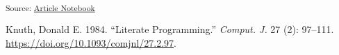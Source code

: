 \documentclass[
  a4paper,
  DIV=11,
  numbers=noendperiod]{scrreprt}
\newlength{\cslhangindent}
\newenvironment{CSLReferences}[2] %
 {\begin{list}{}{%
  \setlength{\itemindent}{0pt}
  \setlength{\leftmargin}{0pt}
  \setlength{\parsep}{0pt}
  \ifodd #1
   \setlength{\leftmargin}{\cslhangindent}
   \setlength{\itemindent}{-1\cslhangindent}
  \fi
  \setlength{\itemsep}{#2\baselineskip}}}
 {\end{list}}
\begin{document}
\textsubscript{Source:
\href{https://sigmadream.github.io/practice-quarto/NBA_2023-24.ipynb.html}{Article
Notebook}}

\label{refs}
\begin{CSLReferences}{1}{0}
Knuth, Donald E. 1984. {``Literate Programming.''} \emph{Comput. J.} 27
(2): 97--111. \url{https://doi.org/10.1093/comjnl/27.2.97}.

\end{CSLReferences}
\end{document}
